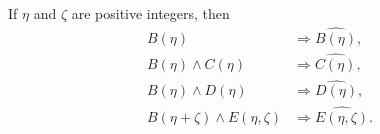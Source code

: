 \begin{theorem}

  \label{thm:343B}
If $\eta$ and $\zeta$ are positive integers, then
\begin{align}
B(\eta) &\Rightarrow \widehat{B(\eta)}, \tag{343d} \\
B(\eta) \wedge C(\eta) &\Rightarrow \widehat{C(\eta)}, \tag{343e} \\
B(\eta) \wedge D(\eta) &\Rightarrow \widehat{D(\eta)}, \tag{343f} \\
B(\eta + \zeta) \wedge E(\eta, \zeta) &\Rightarrow \widehat{E(\eta, \zeta)}. \tag{343g}
\end{align}
\end{theorem}

